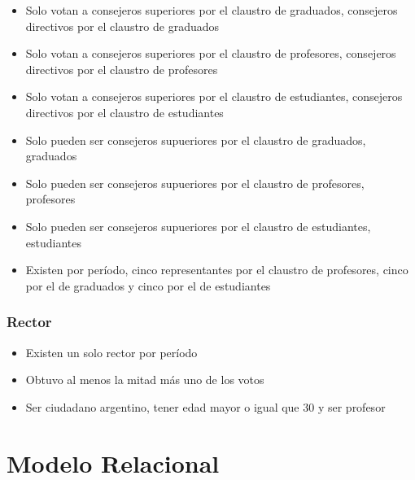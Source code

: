 \documentclass[a4paper, 10pt, twoside]{article}
\begin{document}
\begin{itemize}
\item Solo votan a consejeros superiores por el claustro de graduados, consejeros directivos por el claustro de graduados
\item Solo votan a consejeros superiores por el claustro de profesores, consejeros directivos por el claustro de profesores
\item Solo votan a consejeros superiores por el claustro de estudiantes, consejeros directivos por el claustro de estudiantes
\item Solo pueden ser consejeros supueriores por el claustro de graduados, graduados
\item Solo pueden ser consejeros supueriores por el claustro de profesores, profesores
\item Solo pueden ser consejeros supueriores por el claustro de estudiantes, estudiantes
\item Existen por período, cinco representantes por el claustro de profesores, cinco por el de graduados y cinco por el de estudiantes
\end{itemize}


\subsubsection{Rector}

\begin{itemize}
\item Existen un solo rector por período
\item Obtuvo al menos la mitad más uno de los votos
\item Ser ciudadano argentino, tener edad mayor o igual que 30 y ser profesor
\end{itemize}




\section{Modelo Relacional}
\end{document}
